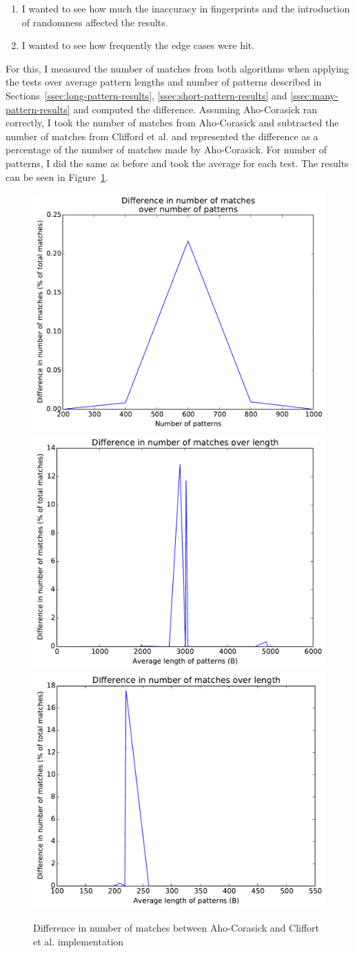 \documentclass[ %
                    author={Dominic Joseph Moylett},
                    degree={MEng},
                     title={Dictionary Matching with Fingerprints},
                  subtitle={An Empirical Analysis},
                      type={research},
                      year={2015} ]{dissertation}
\begin{document}
\begin{enumerate}
  \item I wanted to see how much the inaccuracy in fingerprints and the introduction of randomness affected the results.
  \item I wanted to see how frequently the edge cases were hit.
\end{enumerate}

For this, I measured the number of matches from both algorithms when applying the tests over average pattern lengths and number of patterns described in Sections~\ref{ssec:long-pattern-results}, \ref{ssec:short-pattern-results} and \ref{ssec:many-pattern-results} and computed the difference. Assuming Aho-Corasick ran correctly, I took the number of matches from Aho-Corasick and subtracted the number of matches from Clifford et al. and represented the difference as a percentage of the number of matches made by Aho-Corasick. For number of patterns, I did the same as before and took the average for each test. The results can be seen in Figure~\ref{fig:diff-results}.

\begin{figure}[t]
\begin{center}
  \includegraphics[width=0.5\linewidth]{diff_num_200_1000}\\
  \includegraphics[width=0.5\linewidth]{diff_length_1000_10000}\includegraphics[width=0.5\linewidth]{diff_length_200_1000}
\end{center}
\caption{Difference in number of matches between Aho-Corasick and Cliffort et al. implementation}
\label{fig:diff-results}
\end{figure}
\end{document}
